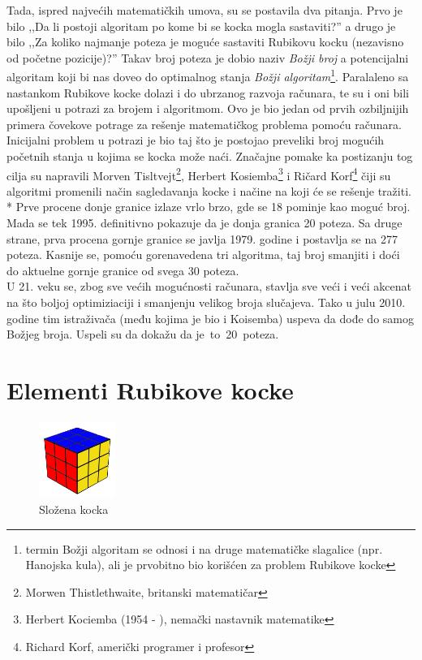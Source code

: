 \documentclass[a4paper]{article}
\begin{document}
Tada, ispred najvećih matematičkih umova, su se postavila dva pitanja. Prvo je bilo ,,Da li postoji algoritam po kome bi se kocka mogla sastaviti?'' a drugo je bilo ,,Za koliko najmanje poteza je moguće sastaviti Rubikovu kocku (nezavisno od početne pozicije)?'' Takav broj poteza je dobio naziv \textit{Božji broj} a potencijalni algoritam koji bi nas doveo do optimalnog stanja \textit{Božji algoritam}\footnote{termin Božji algoritam se odnosi i na druge matematičke slagalice (npr. Hanojska kula), ali je prvobitno bio korišćen za problem Rubikove kocke}. Paralaleno sa nastankom Rubikove kocke dolazi i do ubrzanog razvoja računara, te su i oni bili upošljeni u potrazi za brojem i algoritmom. Ovo je bio jedan od prvih ozbiljnijih primera čovekove potrage za rešenje matematičkog problema pomoću računara. \\

Inicijalni problem u potrazi je bio taj što je postojao preveliki broj mogućih početnih stanja u kojima se kocka može naći. Značajne pomake ka postizanju tog cilja su napravili Morven Tisltvejt\footnote{{Morwen Thistlethwaite}, britanski matematičar}, Herbert Kosiemba\footnote{{Herbert Kociemba} (1954 - ), nemački nastavnik matematike} i Ričard Korf\footnote{{Richard Korf}, američki programer i profesor} čiji su algoritmi promenili način sagledavanja kocke i načine na koji će se rešenje tražiti.\\*
Prve procene donje granice izlaze vrlo brzo, gde se 18 pominje kao moguć broj. Mada se tek 1995. definitivno pokazuje da je donja granica 20 poteza. Sa druge strane, prva procena gornje granice se javlja 1979. godine i postavlja se na 277 poteza. Kasnije se, pomoću gorenavedena tri algoritma, taj broj smanjiti i doći do aktuelne gornje granice od svega 30 poteza.  \\

U 21. veku se, zbog sve većih mogućnosti računara, stavlja sve veći i veći akcenat na što boljoj optimiziaciji i smanjenju velikog broja slučajeva. Tako u julu 2010. godine tim istraživača (među kojima je bio i Koisemba) uspeva da dođe do samog Božjeg broja. Uspeli su da dokažu da je to 20 poteza.

\section{Elementi Rubikove kocke}
\label{sec:elementi}

 \begin{figure}[h!]
        \centering\includegraphics[height=2.5cm]{images/slozena-kocka.png} 
        \caption{Složena kocka}
        \label{fig:slozenakocka}
\end{figure}
\end{document}
